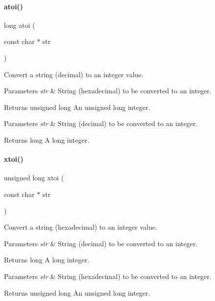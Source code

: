 \paragraph{\texorpdfstring{atoi()}{atoi()}}
{\footnotesize\ttfamily long atoi (\begin{DoxyParamCaption}\item[{const char $\ast$}]{str }\end{DoxyParamCaption})}



Convert a string (decimal) to an integer value. 


\begin{DoxyParams}{Parameters}
{\em str} & String (hexadecimal) to be converted to an integer. \\
\hline
\end{DoxyParams}
\begin{DoxyReturn}{Returns}
unsigned long An unsigned long integer.
\end{DoxyReturn}

\begin{DoxyParams}{Parameters}
{\em str} & String (decimal) to be converted to an integer. \\
\hline
\end{DoxyParams}
\begin{DoxyReturn}{Returns}
long A long integer. 
\end{DoxyReturn}
\mbox{\label{a00116_a9d6165da864d16ad50c13690c1e7d7ea}} 
\paragraph{\texorpdfstring{xtoi()}{xtoi()}}
{\footnotesize\ttfamily unsigned long xtoi (\begin{DoxyParamCaption}\item[{const char $\ast$}]{str }\end{DoxyParamCaption})}



Convert a string (hexadecimal) to an integer value. 


\begin{DoxyParams}{Parameters}
{\em str} & String (decimal) to be converted to an integer. \\
\hline
\end{DoxyParams}
\begin{DoxyReturn}{Returns}
long A long integer.
\end{DoxyReturn}

\begin{DoxyParams}{Parameters}
{\em str} & String (hexadecimal) to be converted to an integer. \\
\hline
\end{DoxyParams}
\begin{DoxyReturn}{Returns}
unsigned long An unsigned long integer. 
\end{DoxyReturn}
